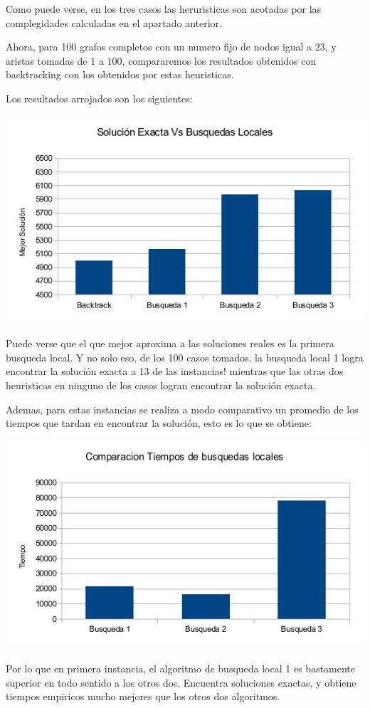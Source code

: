 Como puede verse, en los tres casos las heruristicas son acotadas por las complegidades calculadas en el apartado anterior.

Ahora, para 100 grafos completos con un numero fijo de nodos igual a $23$, y aristas tomadas de $1$ a $100$, compararemos los resultados obtenidos con backtracking con los obtenidos por estas heuristicas.

Los resultados arrojados son los siguientes:

\includegraphics[scale=0.5]{Ej4/solucionestodos.jpg}

Puede verse que el que mejor aproxima a las soluciones reales es la primera busqueda local. Y no solo eso, de los 100 casos tomados, la busqueda local 1 logra encontrar la solución exacta a 13 de las instancias! mientras que las otras dos heuristicas en ninguno de los casos logran encontrar la solución exacta.

Ademas, para estas instancias se realiza a modo comparativo un promedio de los tiempos que tardan en encontrar la solución, esto es lo que se obtiene:

\includegraphics[scale=0.5]{Ej4/tiempotodos.jpg}

Por lo que en primera instancia, el algoritmo de busqueda local 1 es bastamente superior en todo sentido a los otros dos. Encuentra soluciones exactas, y obtiene tiempos empiricos mucho mejores que los otros dos algoritmos.
